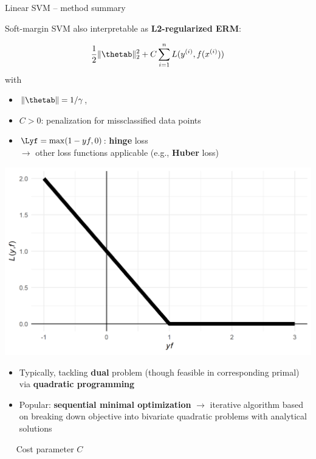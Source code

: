 \begin{vbframe}{Linear SVM -- method summary}
\framebreak


Soft-margin SVM also interpretable as \textbf{L2-regularized ERM}: 

\begin{minipage}[b]{0.58\textwidth}
  $$ \frac{1}{2} \|\thetab\|_2^2 + C \sumin \Lxyi$$ 
  with  
  \begin{itemize}
    \item $\|\thetab\| = 1 / \gamma$,\\
    \item $C > 0$: penalization for missclassified data points
    \item $\Lyf = \max(1-yf, 0)$: \textbf{hinge} loss \\
    $\rightarrow$ other loss functions applicable (e.g., \textbf{Huber} loss)
  \end{itemize}
\end{minipage}
\begin{minipage}[b]{0.4\textwidth}
  \centering
  \includegraphics[height=0.4\textwidth, keepaspectratio=true]{
  figure/plot-hinge-loss.png}
\end{minipage}

\medskip


\begin{itemize}
  \item Typically, tackling \textbf{dual} problem (though feasible 
  in corresponding primal) via \textbf{quadratic programming}
  \item Popular: \textbf{sequential minimal optimization} $\rightarrow$ 
  iterative algorithm based on breaking down objective into bivariate quadratic 
  problems with analytical solutions
\end{itemize}
\medskip

 ~~ Cost parameter \textbf{$C$}

\end{vbframe}

